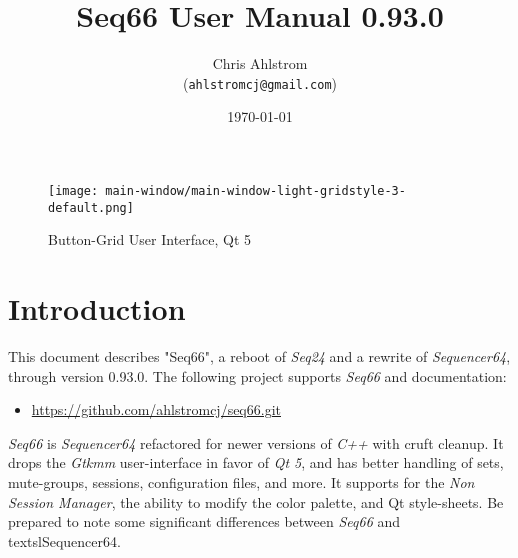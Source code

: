\documentclass[
 11pt,
 twoside,
 a4paper,
 final                                 %
]{article}
\begin{document}
\title{Seq66 User Manual 0.93.0}
\author{Chris Ahlstrom \\
   (\texttt{ahlstromcj@gmail.com})}
\date{\today}
\maketitle

\begin{figure}[H]
   \centering 
   \texttt{[image: main-window/main-window-light-gridstyle-3-default.png]}
   \caption*{Button-Grid User Interface, Qt 5}
\end{figure}

\clearpage                             %

\tableofcontents
\listoffigures                         %
\listoftables                          %


\setlength{\parindent}{2em}
\setlength{\parskip}{1ex plus 0.5ex minus 0.2ex}

\rhead{\rightmark}         %

\section{Introduction}
\label{sec:introduction}

   This document describes "Seq66", a reboot of \textsl{Seq24} and a rewrite of
   \textsl{Sequencer64}, through version 0.93.0.
   The following project supports \textsl{Seq66} and documentation:

   \begin{itemize}
      \item \url{https://github.com/ahlstromcj/seq66.git}
   \end{itemize}

   \textsl{Seq66} is \textsl{Sequencer64} refactored for newer versions of
   \textsl{C++} with cruft cleanup.  It drops the
   \textsl{Gtkmm} user-interface in favor of \textsl{Qt 5},
   and has better handling of sets, mute-groups, sessions, configuration files,
   and more.
   It supports for the \textsl{Non Session Manager}, the ability to
   modify the color palette, and Qt style-sheets.
   Be prepared to note some significant differences
   between \textsl{Seq66} and textsl{Sequencer64}.
\end{document}
